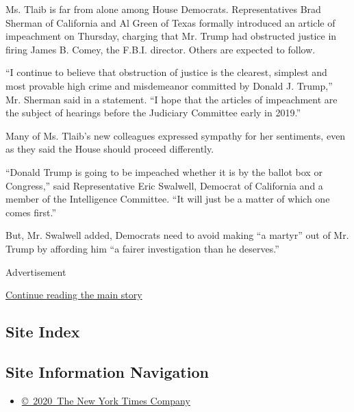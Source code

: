 Ms. Tlaib is far from alone among House Democrats. Representatives Brad
Sherman of California and Al Green of Texas formally introduced an
article of impeachment on Thursday, charging that Mr. Trump had
obstructed justice in firing James B. Comey, the F.B.I. director. Others
are expected to follow.

``I continue to believe that obstruction of justice is the clearest,
simplest and most provable high crime and misdemeanor committed by
Donald J. Trump,'' Mr. Sherman said in a statement. ``I hope that the
articles of impeachment are the subject of hearings before the Judiciary
Committee early in 2019.''

Many of Ms. Tlaib's new colleagues expressed sympathy for her
sentiments, even as they said the House should proceed differently.

``Donald Trump is going to be impeached whether it is by the ballot box
or Congress,'' said Representative Eric Swalwell, Democrat of California
and a member of the Intelligence Committee. ``It will just be a matter
of which one comes first.''

But, Mr. Swalwell added, Democrats need to avoid making ``a martyr'' out
of Mr. Trump by affording him ``a fairer investigation than he
deserves.''

Advertisement

\protect\hyperlink{after-bottom}{Continue reading the main story}

\hypertarget{site-index}{%
\subsection{Site Index}\label{site-index}}

\hypertarget{site-information-navigation}{%
\subsection{Site Information
Navigation}\label{site-information-navigation}}

\begin{itemize}
\tightlist
\item
  \href{https://help.nytimes.com/hc/en-us/articles/115014792127-Copyright-notice}{©~2020~The
  New York Times Company}
\end{itemize}

